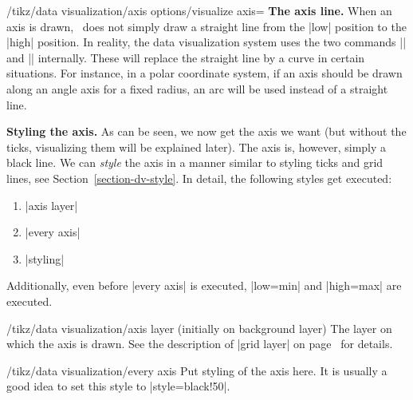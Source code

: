 \begin{key}{/tikz/data visualization/axis options/visualize axis=}
    \medskip
    \textbf{The axis line.}
    When an axis is drawn, \tikzname\ does not simply draw a straight line from
    the |low| position to the |high| position. In reality, the data
    visualization system uses the two commands |\pgfpathdvmoveto| and
    |\pgfpathdvlineto| internally. These will replace the straight line by a
    curve in certain situations. For instance, in a polar coordinate system, if
    an axis should be drawn along an angle axis for a fixed radius, an arc will
    be used instead of a straight line.


    \medskip
    \textbf{Styling the axis.}
    As can be seen, we now get the axis we want (but without the ticks,
    visualizing them will be explained later). The axis is, however, simply a
    black line. We can \emph{style} the axis in a manner similar to styling
    ticks and grid lines, see Section~\ref{section-dv-style}. In detail, the
    following styles get executed:
    \begin{enumerate}
        \item |axis layer|
        \item |every axis|
        \item |styling|
    \end{enumerate}
    Additionally, even before |every axis| is executed, |low=min| and
    |high=max| are executed.

    \begin{stylekey}{/tikz/data visualization/axis layer (initially on background layer)}
        The layer on which the axis is drawn. See the description of
        |grid layer| on page~\pageref{section-dv-grid-layer} for details.
    \end{stylekey}

    \begin{stylekey}{/tikz/data visualization/every axis}
        Put styling of the axis here. It is usually a good idea to set this
        style to |style={black!50}|.
    \end{stylekey}


\end{key}
